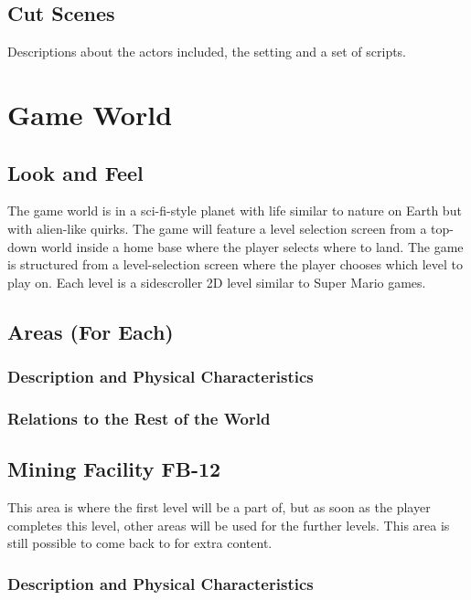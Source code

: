 \documentclass[12pt]{article}
\begin{document}
\subsection{Cut Scenes}

Descriptions about the actors included, the setting and a set of scripts.

\section{Game World}

\subsection{Look and Feel}

The game world is in a sci-fi-style planet with life similar to nature on Earth but with alien-like quirks. The game will feature a level selection screen from a top-down world inside a home base where the player selects where to land. The game is structured from a level-selection screen where the player chooses which level to play on. Each level is a sidescroller 2D level similar to Super Mario games. 

\subsection{Areas (For Each)}

\subsubsection{Description and Physical Characteristics}

\subsubsection{Relations to the Rest of the World}

\subsection{Mining Facility FB-12}

This area is where the first level will be a part of, but as soon as the player completes this level, other areas will be used for the further levels. This area is still possible to come back to for extra content. 

\subsubsection{Description and Physical Characteristics}
\end{document}
